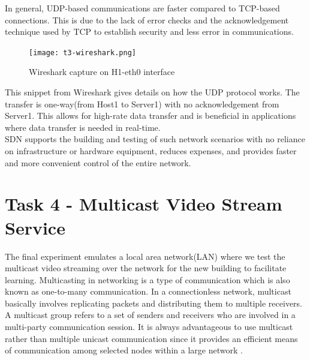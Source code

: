 \documentclass{article}
\begin{document}
\newpage
\par In general, UDP-based communications are faster compared to TCP-based connections. This is due to the lack of error checks and the acknowledgement technique used by TCP to establish security and less error in communications. \\
	\begin{figure}[h]
		\centering
		\texttt{[image: t3-wireshark.png]}
		\caption{Wireshark capture on H1-eth0 interface}
		\label{fig:t3-4}
	\end{figure}
\par This snippet from Wireshark gives details on how the UDP protocol works. The transfer is one-way(from Host1 to Server1) with no acknowledgement from Server1. This allows for high-rate data transfer and is beneficial in applications where data transfer is needed in real-time. \\ SDN supports the building and testing of such network scenarios with no reliance on infrastructure or hardware equipment, reduces expenses, and provides faster and more convenient control of the entire network.

\newpage
\section{Task 4 - Multicast Video Stream Service}
The final experiment emulates a local area network(LAN) where we test the multicast video streaming over the network for the new building to facilitate learning. Multicasting \citep{0202020} in networking is a type of communication which is also known as one-to-many communication. In a connectionless network, multicast basically involves replicating packets and distributing them to multiple receivers. A multicast group refers to a set of senders and receivers who are involved in a multi-party communication session. It is always advantageous to use multicast rather than multiple unicast communication since it provides an efficient means of communication among selected nodes within a large network \citep{1010101}.
\end{document}
